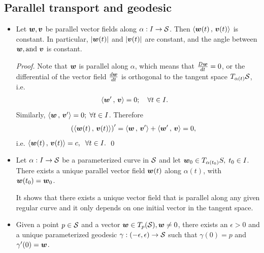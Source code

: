 \documentclass[11pt]{article}
\begin{document}
\subsection{Parallel transport and geodesic}
\begin{itemize}
\item 
\begin{proposition}\label{prop: para_transp}
Let $\boldsymbol{w}, \boldsymbol{v}$ be parallel vector fields along $\alpha: I\rightarrow {\mathcal S}$. Then $\left\langle \boldsymbol{w}(t)\,,\, \boldsymbol{v}(t) \right\rangle$ is constant.  In particular, $\left\lvert \boldsymbol{w}(t) \right\rvert$ and $\left\lvert \boldsymbol{v}(t) \right\rvert$ are constant, and the angle between $\boldsymbol{w}, \text{and }\boldsymbol{v}$ is constant. 
\end{proposition}
\begin{proof}
Note that $\boldsymbol{w}$ is parallel along $\alpha$, which means that $\frac{D\boldsymbol{w}}{dt} =0$, or the differential of the vector field $\frac{d\boldsymbol{w}}{dt}$ is orthogonal to the tangent space $T_{\alpha(t)}{\mathcal S}$, i.e.
\begin{align*}
\left\langle \boldsymbol{w}'\,,\, \boldsymbol{v} \right\rangle &= 0;\quad \forall t\in I.
\end{align*}
Similarly, $\left\langle \boldsymbol{w}\,,\, \boldsymbol{v}' \right\rangle = 0; \;\forall t\in I$. Therefore
\begin{align*}
\left(\left\langle \boldsymbol{w}(t)\,,\, \boldsymbol{v}(t) \right\rangle\right)' &= \left\langle \boldsymbol{w}\,,\, \boldsymbol{v}' \right\rangle+ \left\langle \boldsymbol{w}'\,,\, \boldsymbol{v} \right\rangle = 0,\;
\end{align*}
i.e. $\left\langle \boldsymbol{w}(t)\,,\, \boldsymbol{v}(t) \right\rangle = c,\;\;\forall t\in I. $ \qed
\end{proof}\vspace{10pt}

\item \begin{proposition}\label{prop: para_transp_curv}
Let $\alpha: I\rightarrow {\mathcal S}$ be a parameterized curve in ${\mathcal S}$ and let $\boldsymbol{w}_{0} \in T_{\alpha(t_{0})}S,\; t_{0}\in I$. There exists a unique parallel vector field $\boldsymbol{w}(t)$ along $\alpha(t)$, with $\boldsymbol{w}(t_{0}) = \boldsymbol{w}_{0}$. 
\end{proposition}
It shows that there exists a unique vector field that is parallel along any given regular curve and it only depends on one initial vector in the tangent space. \\

\item \begin{proposition}\label{prop: geo_unique}
Given a point $p\in {\mathcal S}$ and a vector $\boldsymbol{w}\in T_{p}({\mathcal S}), \boldsymbol{w}\neq 0$, there exists an $\epsilon>0$ and a unique parameterized geodesic $\gamma: (-\epsilon, \epsilon) \rightarrow {\mathcal S}$ such that $\gamma(0)=p$ and $\gamma'(0) = \boldsymbol{w}$.
\end{proposition}\vspace{15pt}



\end{itemize}
\end{document}
